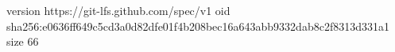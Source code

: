 version https://git-lfs.github.com/spec/v1
oid sha256:e0636ff649c5cd3a0d82dfe01f4b208bec16a643abb9332dab8c2f8313d331a1
size 66
